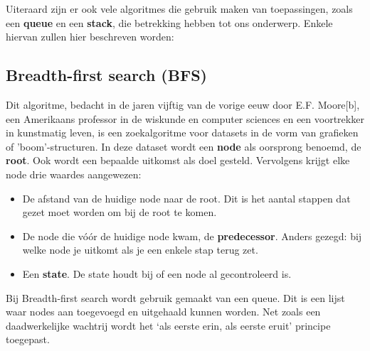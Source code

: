 Uiteraard zijn er ook vele algoritmes die gebruik maken van toepassingen, zoals een \textbf{queue} en een \textbf{stack}, die betrekking hebben tot ons onderwerp. Enkele hiervan zullen hier beschreven worden:

\subsection{Breadth-first search (BFS)}
Dit algoritme, bedacht in de jaren vijftig van de vorige eeuw door E.F. Moore[b], een Amerikaans professor in de wiskunde en computer sciences en een voortrekker in kunstmatig leven, is een zoekalgoritme voor datasets in de vorm van grafieken of 'boom'-structuren. In deze dataset wordt een \textbf{node} als oorsprong benoemd, de \textbf{root}. Ook wordt een bepaalde uitkomst als doel gesteld. Vervolgens krijgt elke node drie waardes aangewezen:
\begin{itemize}
\item De afstand van de huidige node naar de root. Dit is het aantal stappen dat gezet moet worden om bij de root te komen. 
\item De node die v\'{o}\'{o}r de huidige node kwam, de \textbf{predecessor}. Anders gezegd: bij welke node je uitkomt als je een enkele stap terug zet.
\item Een \textbf{state}. De state houdt bij of een node al gecontroleerd is.
\end{itemize}

Bij Breadth-first search wordt gebruik gemaakt van een queue. Dit is een lijst waar nodes aan toegevoegd en uitgehaald kunnen worden. Net zoals een daadwerkelijke wachtrij wordt het `als eerste erin, als eerste eruit' principe toegepast.

